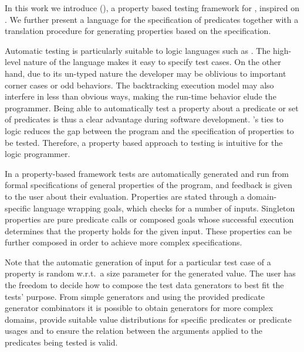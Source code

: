 In this work we introduce \plqc{} (\Prolog\QuickCheck), a
property based testing framework for \Prolog{}, inspired on
 \QuickCheck.
%
We further present a language for the specification of \Prolog{} predicates
together with a translation procedure for generating \plqc{} properties
based on the specification.


Automatic testing is particularly suitable to logic languages such as
\Prolog{}. The high-level nature of the language makes it easy to
specify test cases.
%
On the other hand, due to its un-typed nature the developer may be
oblivious to important corner cases or odd behaviors.
%
The backtracking execution model may also interfere in less than obvious
ways, making the run-time behavior elude the programmer.
%
Being able to automatically test a property about a predicate or set of
predicates is thus a clear advantage during software development.
%
\Prolog{}'s ties to logic reduces the gap between the program and the
specification of properties to be tested.
%
Therefore, a property based approach to testing is intuitive for the
logic programmer.  


In a property-based framework tests are automatically generated and run from formal specifications of general
properties of the program, and feedback is given to the user about their
evaluation.
%
Properties are stated through a domain-specific language wrapping
\Prolog{} goals, which \plqc{} checks for a number of inputs.
%
Singleton properties are 
pure predicate calls
or composed goals whose successful execution determines that the
property holds for the given input.
%
These properties can be further composed in order to achieve more complex
specifications.


%
%
Note that the automatic generation of input for a particular test case of a
property is random w.r.t.\ a size parameter for the generated value.
%
The user has the freedom to decide how to compose the test data
generators to best fit the tests' purpose.
%
From simple generators and using the provided predicate generator
combinators it is possible to obtain generators for more complex
domains, provide suitable value distributions for specific predicates or
predicate usages and to ensure the relation between the arguments applied
to the predicates being tested is valid.


